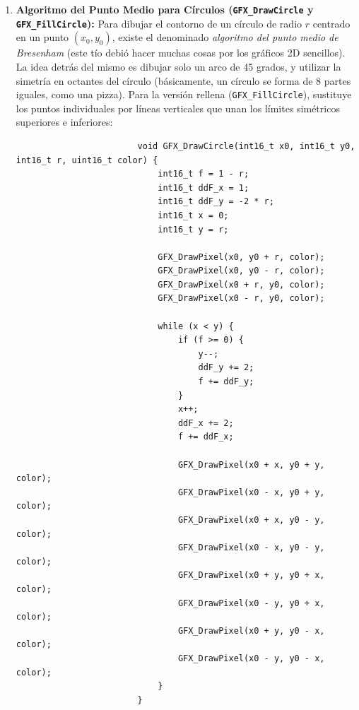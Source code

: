 \documentclass[../main.tex]{subfiles}
\begin{document}
\begin{enumerate}
                \item \textbf{Algoritmo del Punto Medio para Círculos (\texttt{GFX\_DrawCircle} y \texttt{GFX\_FillCircle}):}
                    Para dibujar el contorno de un círculo de radio $r$ centrado en un punto $(x_0, y_0)$, existe el denominado \emph{algoritmo del punto medio de Bresenham} (este tío debió hacer muchas cosas por los gráficos 2D sencillos). La idea detrás del mismo es dibujar solo un arco de 45 grados, y utilizar la simetría en octantes del círculo (básicamente, un círculo se forma de 8 partes iguales, como una pizza). Para la versión rellena (\texttt{GFX\_FillCircle}), sustituye los puntos individuales por líneas verticales que unan los límites simétricos superiores e inferiores:
                    
                    \begin{lstlisting}
                        void GFX_DrawCircle(int16_t x0, int16_t y0, int16_t r, uint16_t color) {
                            int16_t f = 1 - r;
                            int16_t ddF_x = 1;
                            int16_t ddF_y = -2 * r;
                            int16_t x = 0;
                            int16_t y = r;

                            GFX_DrawPixel(x0, y0 + r, color);
                            GFX_DrawPixel(x0, y0 - r, color);
                            GFX_DrawPixel(x0 + r, y0, color);
                            GFX_DrawPixel(x0 - r, y0, color);

                            while (x < y) {
                                if (f >= 0) {
                                    y--;
                                    ddF_y += 2;
                                    f += ddF_y;
                                }
                                x++;
                                ddF_x += 2;
                                f += ddF_x;

                                GFX_DrawPixel(x0 + x, y0 + y, color);
                                GFX_DrawPixel(x0 - x, y0 + y, color);
                                GFX_DrawPixel(x0 + x, y0 - y, color);
                                GFX_DrawPixel(x0 - x, y0 - y, color);
                                GFX_DrawPixel(x0 + y, y0 + x, color);
                                GFX_DrawPixel(x0 - y, y0 + x, color);
                                GFX_DrawPixel(x0 + y, y0 - x, color);
                                GFX_DrawPixel(x0 - y, y0 - x, color);
                            }
                        }
                    \end{lstlisting}
            \end{enumerate}
\end{document}
